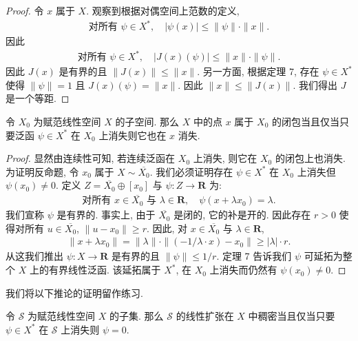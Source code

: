 \documentclass[../../main.tex]{subfiles}
\begin{document}
\begin{proof}
令 $x$ 属于 $X$. 观察到根据对偶空间上范数的定义,
\begin{align*}
\text{对所有 }\psi\in X^{*},\quad|\psi(x)|\leqslant\|\psi\|\cdot\|x\|.
\end{align*}
因此
\begin{align*}
\text{对所有 }\psi\in X^{*},\quad|J(x)(\psi)|\leqslant\|x\|\cdot\|\psi\|.
\end{align*}
因此 $J(x)$ 是有界的且 $\|J(x)\|\leqslant\|x\|$. 另一方面, 根据定理 7, 存在 $\psi\in X^{*}$ 使得 $\|\psi\|=1$ 且 $J(x)(\psi)=\|x\|$. 因此 $\|x\|\leqslant\|J(x)\|$. 我们得出 $J$ 是一个等距.
\end{proof}

\begin{theorem}\label{theorem:ch14-闭包判据}
令 $X_{0}$ 为赋范线性空间 $X$ 的子空间. 那么 $X$ 中的点 $x$ 属于 $X_{0}$ 的闭包当且仅当只要泛函 $\psi\in X^{*}$ 在 $X_{0}$ 上消失则它也在 $x$ 消失.
\end{theorem}

\begin{proof}
显然由连续性可知, 若连续泛函在 $X_{0}$ 上消失, 则它在 $X_{0}$ 的闭包上也消失. 为证明反命题, 令 $x_{0}$ 属于 $X\sim\overline{X_{0}}$. 我们必须证明存在 $\psi\in X^{*}$ 在 $X_{0}$ 上消失但 $\psi(x_{0})\neq 0$. 定义 $Z=\overline{X_{0}}\oplus[x_{0}]$ 与 $\psi:Z\to\mathbf{R}$ 为:
\begin{align*}
\text{对所有 }x\in\overline{X_{0}}\text{ 与 }\lambda\in\mathbf{R},\quad\psi(x+\lambda x_{0})=\lambda.
\end{align*}
我们宣称 $\psi$ 是有界的. 事实上, 由于 $\overline{X_{0}}$ 是闭的, 它的补是开的. 因此存在 $r>0$ 使得对所有 $u\in\overline{X_{0}}$, $\|u-x_{0}\|\geqslant r$. 因此, 对 $x\in\overline{X_{0}}$ 与 $\lambda\in\mathbf{R}$,
\begin{align*}
\|x+\lambda x_{0}\|=\|\lambda\|\cdot\|(-1/\lambda\cdot x)-x_{0}\|\geqslant|\lambda|\cdot r.
\end{align*}
从这我们推出 $\psi:X\to\mathbf{R}$ 是有界的且 $\|\psi\|\leqslant 1/r$. 定理 7 告诉我们 $\psi$ 可延拓为整个 $X$ 上的有界线性泛函. 该延拓属于 $X^{*}$, 在 $X_{0}$ 上消失而仍然有 $\psi(x_{0})\neq 0$.
\end{proof}

我们将以下推论的证明留作练习.

\begin{corollary}\label{corollary:ch14-稠密判据}
令 $\mathcal{S}$ 为赋范线性空间 $X$ 的子集. 那么 $\mathcal{S}$ 的线性扩张在 $X$ 中稠密当且仅当只要 $\psi\in X^{*}$ 在 $\mathcal{S}$ 上消失则 $\psi=0$.
\end{corollary}
\end{document}
